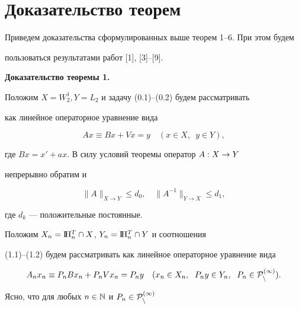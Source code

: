 \section{Доказательство теорем}





Приведем доказательства сформулированных выше теорем 1--6. При этом будем


пользоваться результатами работ [1], [3]--[9].


\medskip





{\bf Доказательство теоремы 1.}


Положим $X=W_2^1, Y=L_2$ и задачу (0.1)--(0.2) будем рассматривать


как линейное операторное уравнение вида


\begin{equation}


Ax\equiv Bx+Vx=y\quad (x\in X,\ \; y\in Y),


\end{equation}


где $Bx=x'+ax$. В силу условий теоремы оператор $A : X \to Y$


непрерывно обратим и


\begin{equation}


\|A\|_{{X\rightarrow Y}} \leq d_0,


\quad \|A^{-1}\|_{{Y\rightarrow X}} \leq d_1,


\end{equation}


где $d_k$ --- положительные постоянные.





Положим $X_n=\mathrm I \!\mathrm H_n^T\cap X$, $Y_n=\mathrm I \!\mathrm H_n^T\cap Y$ и соотношения


(1.1)--(1.2) будем рассматривать как линейное операторное уравнение вида


\begin{equation}


A_nx_n\equiv P_nBx_n+P_nVx_n=P_ny\quad (x_n\in X_n,\ \; P_ny\in Y_n,


\ \; P_n\in \rukopis{P}_n^{(1)}).


\end{equation}


Ясно, что для любых $n\in \Bbb N$ и $P_n\in \cal P_n^{(1)}$


